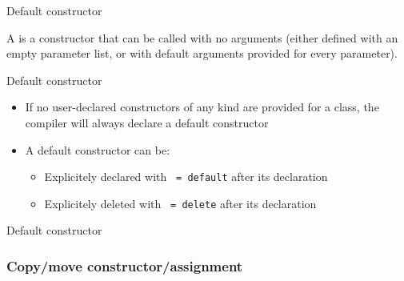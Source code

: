 \begin{frame}{Default constructor}{}
  \begin{definition}
    A  is a constructor that can be called with no arguments (either defined with an empty parameter list, or with default arguments provided for every parameter).
  \end{definition}

  \begin{block}{Default constructor}
    \begin{itemize}
    \item
      If no user-declared constructors of any kind are provided for a class, the compiler will always declare a default constructor
    \item
      A default constructor can be:
      \begin{itemize}
      \item
        Explicitely declared with \lstinline! = default! after its declaration
      \item
        Explicitely deleted with \lstinline! = delete! after its declaration
      \end{itemize}
    \end{itemize}
  \end{block}
\end{frame}

\begin{frame}{Default constructor}{}
  \begin{example}
  \end{example}
\end{frame}


\subsubsection{Copy/move constructor/assignment}

